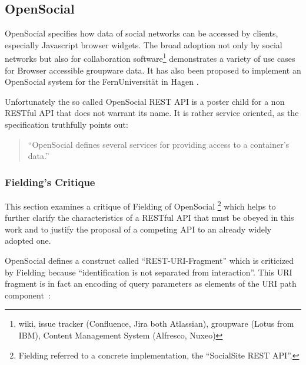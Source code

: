 \documentclass[11pt,a4paper,headsepline,twoside]{scrartcl}		%
\begin{document}
\subsection{OpenSocial}
\label{sec:opensocial-background}


OpenSocial \cite{OSSpec2.0.1} specifies how data of social networks can be
accessed by clients, especially Javascript browser widgets. The broad adoption
not only by social networks but also for collaboration software\footnote{wiki,
  issue tracker (Confluence, Jira both Atlassian), groupware (Lotus from IBM),
  Content Management System (Alfresco, Nuxeo)} demonstrates a variety of use
cases for Browser accessible groupware data. It has also been proposed to
implement an OpenSocial system for the FernUniversität in Hagen
\cite{Huebner2009}.

Unfortunately the so called OpenSocial REST API is a poster child for a non
RESTful API that does not warrant its name. It is rather service oriented, as
the specification truthfully points out\cite[Social API Server, sec
2,Services]{OSSpec2.0.1}:
\begin{quote}
  ``OpenSocial defines several services for providing access to a container's data.''
\end{quote}

\subsubsection{Fielding's Critique}
\label{sec:fieldings-critique}

This section examines a critique of Fielding of OpenSocial
\cite{Fielding2008}\footnote{Fielding referred to a concrete implementation, the
  ``SocialSite REST API''.} which helps to further clarify the characteristics
of a RESTful API that must be obeyed in this work and to justify the proposal of
a competing API to an already widely adopted one.

OpenSocial defines a construct called ``REST-URI-Fragment'' which is criticized
by Fielding because ``identification is not separated from interaction''.  This
URI fragment is in fact an encoding of query parameters as elements of the URI
path component~\cite[Core API Server, sec 2.1.1.2.2,
REST-URI-Fragment]{OSSpec2.0.1}:
\end{document}
